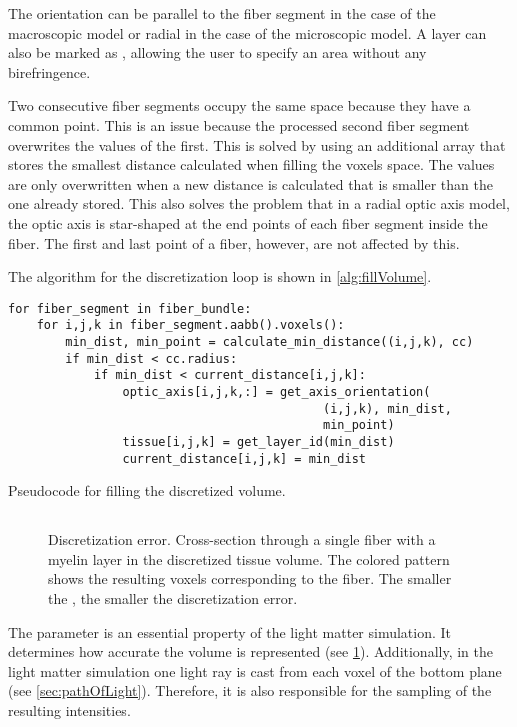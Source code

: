 The orientation can be parallel to the fiber segment in the case of the macroscopic model or radial in the case of the microscopic model.
A layer can also be marked as , allowing the user to specify an area without any birefringence.
\par
%
Two consecutive fiber segments occupy the same space because they have a common point.
This is an issue because the processed second fiber segment overwrites the values of the first.
This is solved by using an additional array that stores the smallest distance calculated when filling the voxels space.
The values are only overwritten when a new distance is calculated that is smaller than the one already stored.
This also solves the problem that in a radial optic axis model, the optic axis is star-shaped at the end points of each fiber segment inside the fiber.
The first and last point of a fiber, however, are not affected by this.
\par
%
The algorithm for the discretization loop is shown in \cref{alg:fillVolume}.
%
\begin{lstfloat}[!tb]
\lstset{style=python}
\begin{lstlisting}[]
for fiber_segment in fiber_bundle:
    for i,j,k in fiber_segment.aabb().voxels():
        min_dist, min_point = calculate_min_distance((i,j,k), cc)
        if min_dist < cc.radius:
            if min_dist < current_distance[i,j,k]:
                optic_axis[i,j,k,:] = get_axis_orientation(
                                            (i,j,k), min_dist,
                                            min_point)
                tissue[i,j,k] = get_layer_id(min_dist)
                current_distance[i,j,k] = min_dist
\end{lstlisting}
\caption[]{Pseudocode for filling the discretized volume.}
\label{alg:fillVolume}
\end{lstfloat}
%
%
%
\subsection{\Voxelsize}
%
\begin{figure}[!t]
\centering
\setlength{\tikzwidth}{.24\textwidth}

\caption[]{Discretization error. Cross-section through a single fiber with a myelin layer in the discretized tissue volume. The colored pattern shows the resulting voxels corresponding to the fiber. The smaller the \Voxelsize, the smaller the discretization error.}
\label{fig:vectorfield_disc_error}
\end{figure}
%
The parameter \Voxelsize{} is an essential property of the light matter simulation.
It determines how accurate the volume is represented (see \cref{fig:vectorfield_disc_error}).
Additionally, in the light matter simulation one light ray is cast from each voxel of the bottom plane (see \cref{sec:pathOfLight}).
Therefore, it is also responsible for the sampling of the resulting intensities.
%
%
%
